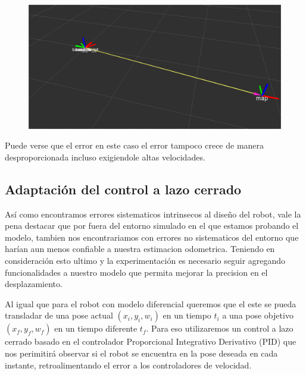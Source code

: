 \begin{figure}[!htb]
\includegraphics[width=\linewidth]{pruebasOdom/3Vueltas2Vel.png}
\end{figure}

Puede verse que el error en este caso el error tampoco crece de manera desproporcionada incluso exigiendole altas velocidades.



\subsection{Adaptación del control a lazo cerrado}

Así como encontramos errores sistematicos intrinsecos al diseño del robot, vale la pena destacar que por fuera del entorno simulado en el que estamos probando el modelo, tambien nos encontrariamos con errores no sistematicos del entorno que harían aun menos confiable a nuestra estimacion odometrica. Teniendo en consideración esto ultimo y la experimentación es necesario seguir agregando funcionalidades a nuestro modelo que permita mejorar la precision en el desplazamiento. 

Al igual que para el robot con modelo diferencial queremos que el este se pueda transladar de una pose actual $(x_i,y_i,w_i)$ en un tiempo $t_i$ a una pose objetivo $(x_f,y_f,w_f)$ en un tiempo diferente $t_f$. Para eso utilizaremos un control a lazo cerrado basado en el controlador Proporcional Integrativo Derivativo (PID) que nos perimitirá observar si el robot se encuentra en la pose deseada en cada instante, retroalimentando el error a los controladores de velocidad.

